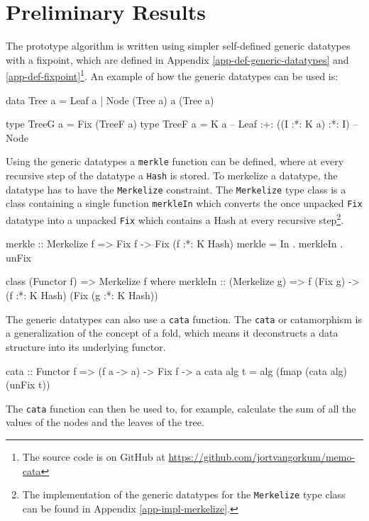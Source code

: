 \section{Preliminary Results}
The prototype algorithm is written using simpler self-defined generic datatypes with a fixpoint, which are defined in Appendix \ref{app-def-generic-datatypes} and \ref{app-def-fixpoint}\footnote{The source code is on GitHub at \hyperlink{https://github.com/jortvangorkum/memo-cata}{https://github.com/jortvangorkum/memo-cata}}. An example of how the generic datatypes can be used is:
\begin{haskell}
data Tree a = Leaf a
            | Node (Tree a) a (Tree a)

type TreeG a = Fix (TreeF a)
type TreeF a = K a                  -- Leaf
            :+: ((I :*: K a) :*: I) -- Node
\end{haskell}

Using the generic datatypes a \texttt{merkle} function can be defined, where at every recursive step of the datatype a \texttt{Hash} is stored. To merkelize a datatype, the datatype has to have the \texttt{Merkelize} constraint. The \texttt{Merkelize} type class is a class containing a single function \texttt{merkleIn} which converts the once unpacked \texttt{Fix} datatype into a unpacked \texttt{Fix} which contains a Hash at every recursive step\footnote{The implementation of the generic datatypes for the \texttt{Merkelize} type class can be found in Appendix \ref{app-impl-merkelize}.}.

\begin{haskell}
merkle :: Merkelize f => Fix f -> Fix (f :*: K Hash)
merkle = In . merkleIn . unFix
\end{haskell}
\begin{haskell}
class (Functor f) => Merkelize f where
  merkleIn :: (Merkelize g) 
           => f (Fix g) -> (f :*: K Hash) (Fix (g :*: K Hash))
\end{haskell}

The generic datatypes can also use a \texttt{cata} function. The \texttt{cata} or catamorphism is a generalization of the concept of a fold, which means it deconstructs a data structure into its underlying functor\cite{HaskellWikiCatamorphism}.

\begin{haskell}
cata :: Functor f => (f a -> a) -> Fix f -> a
cata alg t = alg (fmap (cata alg) (unFix t)) 
\end{haskell}

The \texttt{cata} function can then be used to, for example, calculate the sum of all the values of the nodes and the leaves of the tree.

